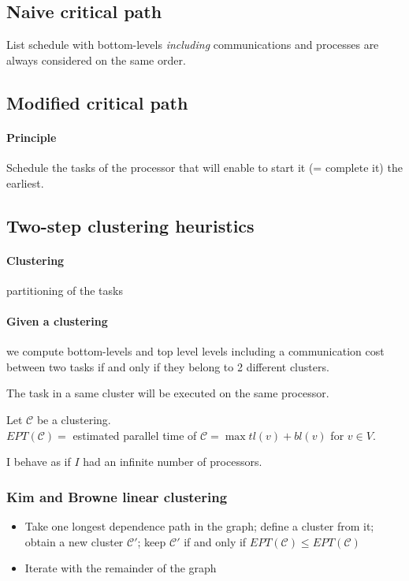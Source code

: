 \subsection{Naive critical path}
List schedule with bottom-levels \emph{including} communications and processes are always considered on the same order.


\subsection{Modified critical path}
\paragraph{Principle}
Schedule the tasks of the processor that will enable to start it (= complete it) the earliest.


\subsection{Two-step clustering heuristics}
\paragraph{Clustering}
partitioning of the tasks

\paragraph{Given a clustering}
we compute bottom-levels and top level levels including a communication cost between two tasks if and only if they belong to 2 different clusters.

The task in a same cluster will be executed on the same processor.

Let $\mathcal{C}$ be a clustering.\\
$EPT(\mathcal{C})=$ estimated parallel time of $\mathcal{C}=\max tl(v) + bl(v)$ for $v\in V$.

I behave as if $I$ had an infinite number of processors.

\subsubsection*{Kim and Browne linear clustering}
\begin{itemize}
\item Take one longest dependence path in the graph; define a cluster from it; obtain a new cluster $\mathcal{C}'$; keep $\mathcal{C}'$ if and only if $EPT(\mathcal{C})\leq EPT(\mathcal{C})$
\item Iterate with the remainder of the graph
\end{itemize}


